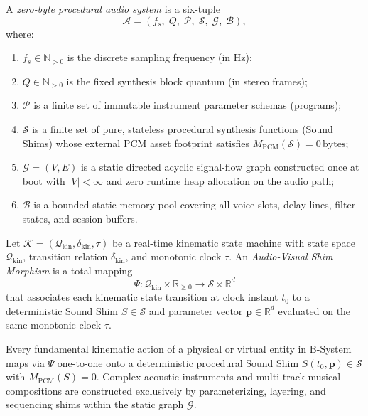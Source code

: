 \begin{definition}
A \emph{zero-byte procedural audio system} is a six-tuple
\begin{equation}
\mathcal{A} = (f_s,\; Q,\; \mathcal{P},\; \mathcal{S},\; \mathcal{G},\; \mathcal{B}),
\end{equation}
where:
\begin{enumerate}[leftmargin=1.5em]
  \item $f_s \in \mathbb{N}_{>0}$ is the discrete sampling frequency (in Hz);
  \item $Q \in \mathbb{N}_{>0}$ is the fixed synthesis block quantum (in stereo frames);
  \item $\mathcal{P}$ is a finite set of immutable instrument parameter schemas (programs);
  \item $\mathcal{S}$ is a finite set of pure, stateless procedural synthesis functions (Sound Shims) whose external PCM asset footprint satisfies $M_{\mathrm{PCM}}(\mathcal{S}) = 0\,\text{bytes}$;
  \item $\mathcal{G} = (V, E)$ is a static directed acyclic signal-flow graph constructed once at boot with $|V| < \infty$ and zero runtime heap allocation on the audio path;
  \item $\mathcal{B}$ is a bounded static memory pool covering all voice slots, delay lines, filter states, and session buffers.
\end{enumerate}
\end{definition}

\begin{definition}
Let $\mathcal{K} = (\mathcal{Q}_{\mathrm{kin}}, \delta_{\mathrm{kin}}, \tau)$ be a real-time kinematic state machine with state space $\mathcal{Q}_{\mathrm{kin}}$, transition relation $\delta_{\mathrm{kin}}$, and monotonic clock $\tau$. An \emph{Audio-Visual Shim Morphism} is a total mapping
\begin{equation}
\Psi : \mathcal{Q}_{\mathrm{kin}} \times \mathbb{R}_{\ge 0} \longrightarrow \mathcal{S} \times \mathbb{R}^d
\end{equation}
that associates each kinematic state transition at clock instant $t_0$ to a deterministic Sound Shim $S \in \mathcal{S}$ and parameter vector $\mathbf{p} \in \mathbb{R}^d$ evaluated on the same monotonic clock $\tau$.
\end{definition}

\begin{invariant}
Every fundamental kinematic action of a physical or virtual entity in B-System maps via $\Psi$ one-to-one onto a deterministic procedural Sound Shim $S(t_0, \mathbf{p}) \in \mathcal{S}$ with $M_{\mathrm{PCM}}(S) = 0$. Complex acoustic instruments and multi-track musical compositions are constructed exclusively by parameterizing, layering, and sequencing shims within the static graph $\mathcal{G}$.
\end{invariant}

